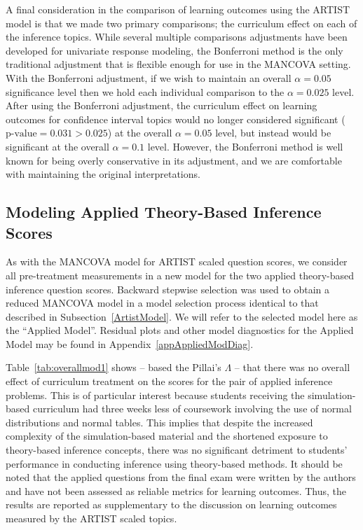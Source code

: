 A final consideration in the comparison of learning outcomes using the ARTIST model is that we made two primary comparisons; the curriculum effect on each of the inference topics. While several multiple comparisons adjustments have been developed for univariate response modeling, the Bonferroni method is the only traditional adjustment that is flexible enough for use in the MANCOVA setting. With the Bonferroni adjustment, if we wish to maintain an overall $\alpha=0.05$ significance level then we hold each individual comparison to the $\alpha=0.025$ level. After using the Bonferroni adjustment, the curriculum effect on learning outcomes for confidence interval topics would no longer considered significant ($\text{p-value} = 0.031 > 0.025$) at the overall $\alpha = 0.05$ level, but instead would be significant at the overall $\alpha = 0.1$ level.  However, the Bonferroni method is well known for being overly conservative in its adjustment, and we are comfortable with maintaining the original interpretations.

\subsection{Modeling Applied Theory-Based Inference Scores}
\label{AppliedModel}

As with the MANCOVA model for ARTIST scaled question scores, we consider all pre-treatment measurements in a new model for the two applied theory-based inference question scores.  Backward stepwise selection was used to obtain a reduced MANCOVA model in a model selection process identical to that described in Subsection~\ref{ArtistModel}. We will refer to the selected model here as the ``Applied Model''.  Residual plots and other model diagnostics for the Applied Model may be found in Appendix~\ref{appAppliedModDiag}.

Table~\ref{tab:overallmod1} shows -- based the Pillai's $\Lambda$ -- that there was no overall effect of curriculum treatment on the scores for the pair of applied inference problems. This is of particular interest because students receiving the simulation-based curriculum had three weeks less of coursework involving the use of normal distributions and normal tables. This implies that despite the increased complexity of the simulation-based material and the shortened exposure to theory-based inference concepts, there was no significant detriment to students' performance in conducting inference using theory-based methods. It should be noted that the applied questions from the final exam were written by the authors and have not been assessed as reliable metrics for learning outcomes. Thus, the results are reported as supplementary to the discussion on learning outcomes measured by the ARTIST scaled topics.



